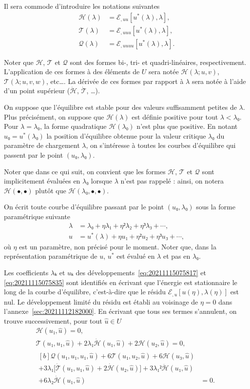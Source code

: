 \documentclass[12pt, final]{amsart}
\begin{document}
Il sera commode d'introduire les notations suivantes
\begin{align}
  ℋ(λ)&=ℰ_{,uu}[u^*(λ), λ],\\
  𝒯(λ)&=ℰ_{,uuu}[u^*(λ), λ],\\
  𝒬(λ)&=ℰ_{,uuuu}[u^*(λ), λ].
\end{align}

Noter que \(ℋ\), \(𝒯\) et \(𝒬\) sont des formes bi-,
tri- et quadri-linéaires, respectivement. L'application de ces formes à des
éléments de \(U\) sera notée \(ℋ(λ; u, v)\),
\(𝒯(λ; u, v, w)\), etc\dots. La dérivée de ces formes par
rapport à \(λ\) sera notée à l'aide d'un point supérieur
(\(\dot{ℋ}\), \(\dot{𝒯}\), \dots).

On suppose que l'équilibre est stable pour des valeurs suffisamment petites de
\(λ\). Plus précisément, on suppose que \(ℋ(λ)\) est
définie positive pour tout \(λ<λ₀\). Pour \(λ=λ₀\),
la forme quadratique \(ℋ(λ₀)\) n'est plus que positive. En
notant \(u₀=u^*(λ₀)\) la position d'équilibre obtenue pour la valeur
critique \(λ₀\) du paramètre de chargement \(λ\), on s'intéresse à
toutes les courbes d'équilibre qui passent par le point \((u₀, λ₀)\).

Noter que dans ce qui suit, on convient que les formes \(ℋ\),
\(𝒯\) et \(𝒬\) sont implicitement évaluées en \(λ₀\)
lorsque \(λ\) n'est pas rappelé : ainsi, on notera
\(ℋ(•, •)\) plutôt que
\(ℋ(λ₀, •, •)\).

On écrit toute courbe d'équilibre passant par le point \((u₀, λ₀)\)
sous la forme paramétrique suivante
\begin{align}
  \label{eq:20211115075817}
  λ&=λ₀+ηλ₁+η²λ₂+η³λ₃+\cdots,\\
  \label{eq:20211115075835}
  u&=u^*(λ)+η u₁+η² u₂+η³u₃+\cdots,
\end{align}
où \(η\) est un paramètre, non précisé pour le moment. Noter que, dans la
représentation paramétrique de \(u\), \(u^*\) est évalué en \(λ\) et
pas en \(λ₀\).

Les coefficients \(λ ₖ\) et \(uₖ\) des
développements~\eqref{eq:20211115075817} et \eqref{eq:20211115075835} sont
identifiés en écrivant que l'énergie est stationnaire le long de la courbe
d'équilibre, c'est-à-dire que le résidu
\(ℰ_{,u}[u(η), λ(η)]\) est nul. Le développement limité du
résidu est établi au voisinage de \(η=0\) dans
l'annexe~\ref{sec:20211112182000}. En écrivant que tous ses termes s'annulent,
on trouve successivement, pour tout \(\hat{u}∈ U\)
\begin{gather}
  \label{eq:20211112182917}
  ℋ(u₁, \hat{u})=0,\\
  \label{eq:20211112183220}
  𝒯(u₁, u₁, \hat{u})
  +2λ₁\dot{ℋ}(u₁, \hat{u})
  +2ℋ(u₂, \hat{u})=0,\\
  \begin{aligned}[b]
    𝒬(u₁, u₁, u₁, \hat{u})
    +6𝒯(u₁, u₂, \hat{u})+6ℋ(u₃, \hat{u})&\\
    +3λ₁\bigl[\dot{𝒯}(u₁, u₁, \hat{u})
    +2\dot{ℋ}(u₂, \hat{u})\bigr]
    +3λ₁²\ddot{ℋ}(u₁, \hat{u})&\\
    +6λ₂\dot{ℋ}(u₁, \hat{u})&=0.
  \end{aligned}
\end{gather}
\end{document}
